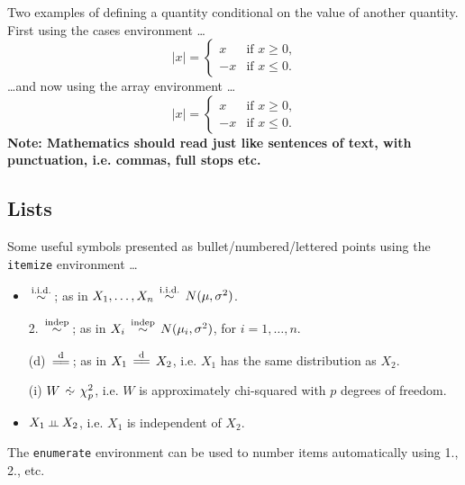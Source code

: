\documentclass[a4paper,12pt,titlepage]{article} %
\let\leq=\leqslant   %
\let\geq=\geqslant
\numberwithin{equation}{section}  %
\begin{document}
Two examples of defining a quantity conditional on the value of another quantity. First using the cases environment \ldots
\begin{equation*}
|x|=
\begin{cases} x & \text{if $x \geq 0$,} \\      %
-x &\text{if $x \leq 0$.}
\end{cases}
\end{equation*}
\ldots and now using the array environment \ldots
\begin{equation*}
|x|= \left\{                                    %
\begin{array}{rc} x & \text{if $x \geq 0$,} \\  %
-x &\text{if $x \leq 0$.}
\end{array} \right.                             %
\end{equation*}
{\bf Note: Mathematics should read just like sentences of text, with punctuation, i.e. commas, full stops etc.}

\subsection{Lists}
\label{sec:lists}
\newcommand{\simiid}{\,\stackrel{{\rm\tiny i.i.d.}}{\sim}\,}  %
\newcommand{\simindep}{\,\stackrel{{\rm\tiny indep}}{\sim}\,} %
\newcommand{\dist}{\,\stackrel{{\rm\tiny d}}{=\!=}\,}         %

\def\approxd{\setbox0=\hbox{$\sim$}                           %
\setbox1=\hbox to \wd0{\hss.\hss}%
\kern 4 pt\raise0.1ex\copy0\kern-\wd0\raise1.2ex%
\copy1\kern-\wd0\copy1\kern 4 pt}

\def\dperp{ \mathrel{\kern0pt\vbox{\hbox to 0.8em{\hss
\setbox0=\hbox{$\shortparallel$}\dp0=0pt\box0\hss}\hrule width 0.8em}}}

Some useful symbols presented as  bullet/numbered/lettered points using the \verb!itemize! environment \ldots
\begin{itemize}
\item $\simiid$; as in $X_1,\ldots,X_n \simiid N(\mu,\sigma^2)$.
\item [2.] $\simindep$; as in $X_i \simindep N(\mu_i,\sigma^2)$, for $i=1,\ldots,n$.
\item [(d)] $\dist$; as in $X_1 \dist X_2$, i.e. $X_1$ has the same distribution as $X_2$.
\item [(i)] $W \approxd \chi^2_p$, i.e. $W$ is approximately chi-squared with $p$ degrees of freedom.
\item $X_1 \dperp X_2$, i.e. $X_1$ is independent of $X_2$.
\end{itemize}
The \verb!enumerate! environment can be used to number items automatically using 1., 2., etc.
\end{document}
